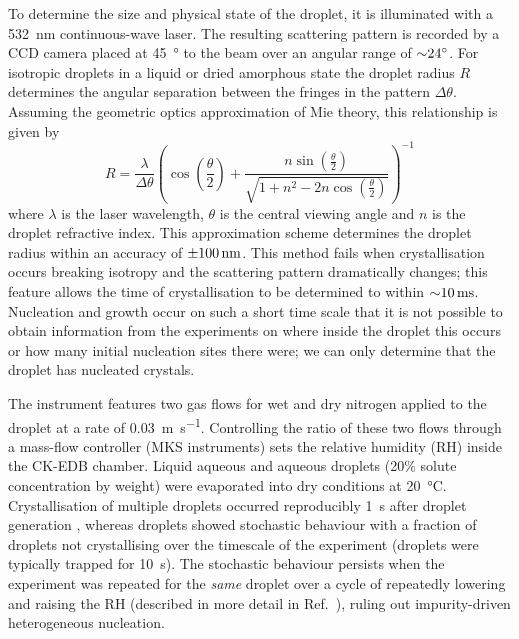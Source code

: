 \documentclass[11pt,twoside]{report}
\begin{document}
To determine the size and physical state of the droplet, it is illuminated with a \SI{532}{\nano\metre} continuous-wave laser.
The resulting scattering pattern is recorded by a CCD camera placed at \SI{45}{\degree} to the beam over an angular range of $\SI{\sim24}{\degree}$.
For isotropic droplets in a liquid or dried amorphous state the droplet radius $R$ determines the angular separation between the fringes in the pattern $\Delta \theta$.
Assuming the geometric optics approximation of Mie theory, this relationship is given by
\begin{equation*}
  R
  =
  \frac{\lambda}{\Delta \theta} \left(
  \cos{\left(\frac{\theta}{2}\right)}
  + \frac{n \sin{\left(\frac{\theta}{2}\right)}}{\sqrt{1 + n^2 - 2n \cos{\left(\frac{\theta}{2}\right)}}}
  \right)^{-1}
\end{equation*}
where $\lambda$ is the laser wavelength, $\theta$ is the central viewing angle and $n$ is the droplet refractive index.
This approximation scheme determines the droplet radius within an accuracy of $\SI{\pm100}{\nano\metre}$.
This method fails when crystallisation occurs breaking isotropy and the scattering pattern dramatically changes; this feature allows the time of crystallisation to be determined to within $\SI{\sim10}{\milli\second}$.
Nucleation and growth occur on such a short time scale that it is not possible to obtain information from the experiments on where inside the droplet this occurs or how many initial nucleation sites there were; we can only determine that the droplet has nucleated crystals.

The instrument features two gas flows for wet and dry nitrogen applied to the droplet at a rate of \SI{0.03}{\metre\per\second}.
Controlling the ratio of these two flows through a mass-flow controller (MKS instruments) sets the relative humidity (RH) inside the CK-EDB chamber.
Liquid aqueous  and aqueous  droplets (20\% solute concentration by weight) were evaporated into dry conditions at \SI{20}{\celsius}.
Crystallisation of multiple  droplets occurred reproducibly \SI{1}{\second} after droplet generation \cite{GregsonJPCB2019}, whereas  droplets showed stochastic behaviour with a fraction of droplets not crystallising over the timescale of the experiment (droplets were typically trapped for \SI{10}{\second}).
The stochastic behaviour persists when the experiment was repeated for the \emph{same}  droplet over a cycle of repeatedly lowering and raising the RH (described in more detail in Ref.\ \cite{GregsonTBD2019}), ruling out impurity-driven heterogeneous nucleation.
\end{document}
